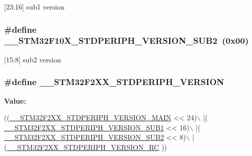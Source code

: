 \mbox{[}23\-:16\mbox{]} sub1 version \hypertarget{group___library__configuration__section_ga3ec41777ab08436b801c9c295248a6c7}{
\subsubsection[{\-\_\-\-\_\-\-S\-T\-M32\-F10\-X\-\_\-\-S\-T\-D\-P\-E\-R\-I\-P\-H\-\_\-\-V\-E\-R\-S\-I\-O\-N\-\_\-\-S\-U\-B2}]{\setlength{\rightskip}{0pt plus 5cm}\#define \-\_\-\-\_\-\-S\-T\-M32\-F10\-X\-\_\-\-S\-T\-D\-P\-E\-R\-I\-P\-H\-\_\-\-V\-E\-R\-S\-I\-O\-N\-\_\-\-S\-U\-B2~(0x00)}}\label{group___library__configuration__section_ga3ec41777ab08436b801c9c295248a6c7}
\mbox{[}15\-:8\mbox{]} sub2 version \hypertarget{group___library__configuration__section_gaca5d272ea18c32aa012b36bd302ebdc4}{
\subsubsection[{\-\_\-\-\_\-\-S\-T\-M32\-F2\-X\-X\-\_\-\-S\-T\-D\-P\-E\-R\-I\-P\-H\-\_\-\-V\-E\-R\-S\-I\-O\-N}]{\setlength{\rightskip}{0pt plus 5cm}\#define \-\_\-\-\_\-\-S\-T\-M32\-F2\-X\-X\-\_\-\-S\-T\-D\-P\-E\-R\-I\-P\-H\-\_\-\-V\-E\-R\-S\-I\-O\-N}}\label{group___library__configuration__section_gaca5d272ea18c32aa012b36bd302ebdc4}
{\bfseries Value\-:}
\begin{DoxyCode}
((\hyperlink{group___library__configuration__section_ga072660793dc1fbd608d6f5ed08ba99cc}{\_\_STM32F2XX\_STDPERIPH\_VERSION\_MAIN} << 24)\(\backslash\)
                                             |(
      \hyperlink{group___library__configuration__section_ga888af6ba4a16afadd1c64108a36b9a24}{\_\_STM32F2XX\_STDPERIPH\_VERSION\_SUB1} << 16)\(\backslash\)
                                             |(
      \hyperlink{group___library__configuration__section_gaefad6115d1d1c9b6444fe5130fa70aa3}{\_\_STM32F2XX\_STDPERIPH\_VERSION\_SUB2} << 8)\(\backslash\)
                                             |(\hyperlink{group___library__configuration__section_ga76710ff54eeec299653334d25b548073}{\_\_STM32F2XX\_STDPERIPH\_VERSION\_RC}
      ))
\end{DoxyCode}
